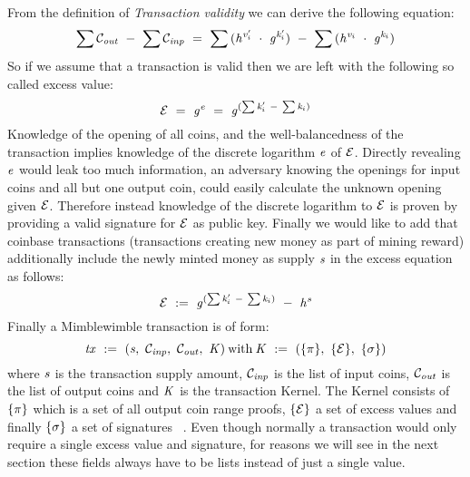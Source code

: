 From the definition of \emph{Transaction validity} we can derive the following equation:
\[ \sum{\mathcal{C}_{\mathit{out}}} ~-~ \sum{\mathcal{C}_{\mathit{inp}}} ~=~ \sum{(\mathit{h}^{\mathit{v}'_i} ~\cdot~\mathit{g}^{\mathit{k}'_i})} ~-~ \sum{(\mathit{h}^{\mathit{v}_i} ~\cdot~\mathit{g}^{\mathit{k}_i})} \]
So if we assume that a transaction is valid then we are left with the following so called excess value:
\[ \mathcal{E} ~=~ \mathit{g}^{\mathit{e}} ~=~ \mathit{g}^{(\sum{\mathit{k}'_i} ~-~ \sum{\mathit{k}_i})} \]
Knowledge of the opening of all coins, and the well-balancedness of the transaction implies knowledge of the discrete logarithm $\mathit{e}$ of $\mathcal{E}$.
Directly revealing $\mathit{e}$ would leak too much information, an adversary knowing the openings for input coins and all but one output coin, could easily calculate the unknown opening given $\mathcal{E}$.
Therefore instead knowledge of the discrete logarithm to $\mathcal{E}$ is proven by providing a valid signature for $\mathcal{E}$ as public key.
Finally we would like to add that coinbase transactions (transactions creating new money as part of mining reward) additionally include the newly minted money as supply $\mathit{s}$ in the excess equation as follows:
\[ \mathcal{E} ~:=~ \mathit{g}^{(\sum{\mathit{k}'_i} ~-~ \sum{\mathit{k}_i})} ~-~ \mathit{h}^{\mathit{s}} \]
Finally a Mimblewimble transaction is of form:
\[ \mathit{tx} ~:=~ (\mathit{s} ,~ \mathcal{C}_{\mathit{inp}} ,~ \mathcal{C}_{\mathit{out}} ,~ \mathit{K})\:\text{with}\:\mathit{K} ~:=~ (\{\pi\} ,~ \{\mathcal{E}\} ,~ \{\sigma\}) \]
where $\mathit{s}$ is the transaction supply amount, $\mathcal{C}_{\mathit{inp}}$ is the list of input coins, $\mathcal{C}_{\mathit{out}}$ is the list of output coins and $\mathit{K}$ is the transaction Kernel.
The Kernel consists of $\{\pi\}$ which is a set of all output coin range proofs, $\{\mathcal{E}\}$ a set of excess values and finally $\{\sigma\}$ a set of signatures ~\cite{fuchsbauer2019aggregate}.
Even though normally a transaction would only require a single excess value and signature, for reasons we will see in the next section these fields always have to be lists instead of just a single value.

